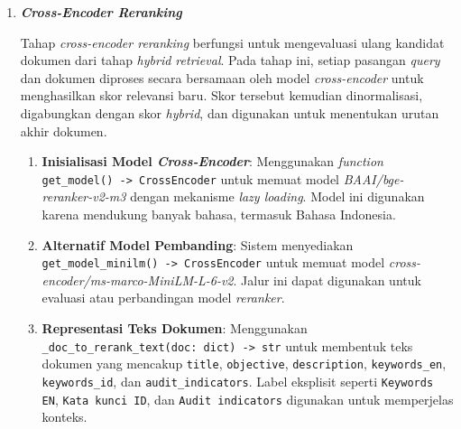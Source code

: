 \documentclass[12pt,a4paper]{article}
\begin{document}
\begin{enumerate}[leftmargin=1.1cm]
\begin{enumerate}[label=\alph*., leftmargin=1.1cm]
\item \textbf{Pengaturan Bobot \textit{Dense} dan \textit{Sparse}}: Parameter \texttt{alpha\_dense} dan \texttt{alpha\_sparse} digunakan untuk mengatur kontribusi skor \textit{dense} dan \textit{sparse} dalam pembentukan \texttt{hybrid\_score}. Skor ini menjadi dasar pengurutan kandidat tahap pertama.

\item \textbf{Penyimpanan Informasi Kandidat}: Setiap kandidat menyimpan informasi kontrol ISO seperti \texttt{control\_id}, \texttt{title}, \texttt{objective}, dan \texttt{description}, serta skor \textit{dense}, \textit{sparse}, dan \textit{hybrid}. Informasi ini dipertahankan karena digunakan kembali pada tahap penggabungan skor setelah proses \textit{reranking}.
\end{enumerate}

\item \textbf{\textit{Cross-Encoder Reranking}}

Tahap \textit{cross-encoder reranking} berfungsi untuk mengevaluasi ulang kandidat dokumen dari tahap \textit{hybrid retrieval}. Pada tahap ini, setiap pasangan \textit{query} dan dokumen diproses secara bersamaan oleh model \textit{cross-encoder} untuk menghasilkan skor relevansi baru. Skor tersebut kemudian dinormalisasi, digabungkan dengan skor \textit{hybrid}, dan digunakan untuk menentukan urutan akhir dokumen.

\begin{enumerate}[label=\alph*., leftmargin=1.1cm]
\item \textbf{Inisialisasi Model \textit{Cross-Encoder}}: Menggunakan \textit{function} \texttt{get\_model() -> CrossEncoder} untuk memuat model \textit{BAAI/bge-reranker-v2-m3} dengan mekanisme \textit{lazy loading}. Model ini digunakan karena mendukung banyak bahasa, termasuk Bahasa Indonesia.

\item \textbf{Alternatif Model Pembanding}: Sistem menyediakan \texttt{get\_model\_minilm() -> CrossEncoder} untuk memuat model \textit{cross-encoder/ms-marco-MiniLM-L-6-v2}. Jalur ini dapat digunakan untuk evaluasi atau perbandingan model \textit{reranker}.

\item \textbf{Representasi Teks Dokumen}: Menggunakan \texttt{\_doc\_to\_rerank\_text(doc: dict) -> str} untuk membentuk teks dokumen yang mencakup \texttt{title}, \texttt{objective}, \texttt{description}, \texttt{keywords\_en}, \texttt{keywords\_id}, dan \texttt{audit\_indicators}. Label eksplisit seperti \texttt{Keywords EN}, \texttt{Kata kunci ID}, dan \texttt{Audit indicators} digunakan untuk memperjelas konteks.


\end{enumerate}
\end{enumerate}
\end{document}
